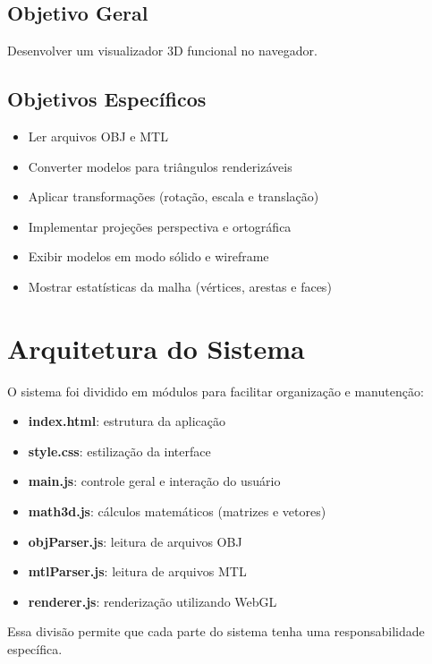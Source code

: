 \documentclass[12pt,a4paper]{article}
\begin{document}
\subsection{Objetivo Geral}
Desenvolver um visualizador 3D funcional no navegador.

\subsection{Objetivos Específicos}
\begin{itemize}
    \item Ler arquivos OBJ e MTL
    \item Converter modelos para triângulos renderizáveis
    \item Aplicar transformações (rotação, escala e translação)
    \item Implementar projeções perspectiva e ortográfica
    \item Exibir modelos em modo sólido e wireframe
    \item Mostrar estatísticas da malha (vértices, arestas e faces)
\end{itemize}

\section{Arquitetura do Sistema}

O sistema foi dividido em módulos para facilitar organização e manutenção:

\begin{itemize}
    \item \textbf{index.html}: estrutura da aplicação
    \item \textbf{style.css}: estilização da interface
    \item \textbf{main.js}: controle geral e interação do usuário
    \item \textbf{math3d.js}: cálculos matemáticos (matrizes e vetores)
    \item \textbf{objParser.js}: leitura de arquivos OBJ
    \item \textbf{mtlParser.js}: leitura de arquivos MTL
    \item \textbf{renderer.js}: renderização utilizando WebGL
\end{itemize}

Essa divisão permite que cada parte do sistema tenha uma responsabilidade específica.
\end{document}
